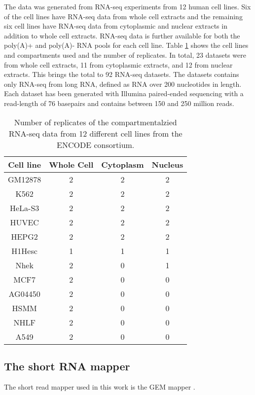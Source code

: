 The data was generated from RNA-seq experiments from 12 human cell lines. Six
of the cell lines have RNA-seq data from whole cell extracts and the remaining
six cell lines have RNA-seq data from cytoplasmic and nuclear extracts in
addition to whole cell extracts. RNA-seq data is further available for both the
poly(A)+ and poly(A)- RNA pools for each cell line. Table \ref{tab:datasets}
shows the cell lines and compartments used and the number of replicates. In
total, 23 datasets were from whole cell extracts, 11 from cytoplasmic extracts,
and 12 from nuclear extracts. This brings the total to 92 RNA-seq datasets. The
datasets contains only RNA-seq from long RNA, defined as RNA over 200
nucleotides in length. Each dataset has been generated with Illumina
paired-ended sequencing with a read-length of 76 basepairs and contains between
150 and 250 million reads.

\begin{table}[hb]
	\centering
	\begin{tabular}{cccc}
	  Cell line & Whole Cell & Cytoplasm & Nucleus \\
	  \midrule
	  GM12878 & 2 & 2 & 2 \\
	  K562 & 2 & 2 & 2 \\
	  HeLa-S3 & 2 & 2 & 2 \\
	  HUVEC & 2 & 2 & 2 \\
	  HEPG2 & 2 & 2 & 2 \\
	  H1Hesc & 1 & 1 & 1 \\
	  Nhek & 2 & 0 & 1 \\
	  MCF7 & 2 & 0 & 0 \\
	  AG04450 & 2 & 0 & 0 \\
	  HSMM & 2 & 0 & 0 \\
	  NHLF & 2 & 0 & 0 \\
	  A549 & 2 & 0 & 0 \\
	\end{tabular}
	\caption{Number of replicates of the compartmentalzied RNA-seq data from 12
	different cell lines from the ENCODE consortium.}
	\label{tab:datasets}
\end{table}

\subsection{The short RNA mapper}
The short read mapper used in this work is the GEM mapper
\cite{marco-sola_gem_2012}.

